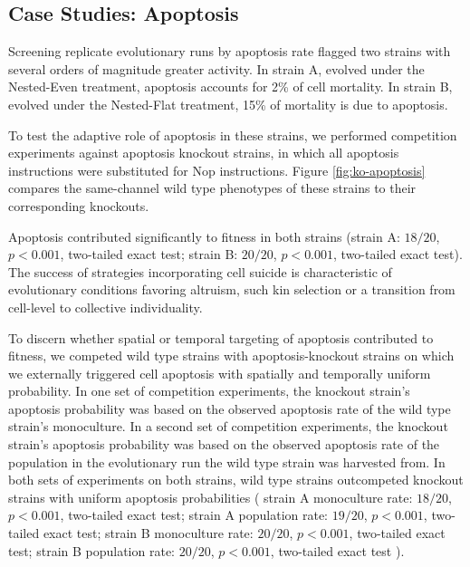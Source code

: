 \subsection{Case Studies: Apoptosis} \label{sec:apoptosis}



Screening replicate evolutionary runs by apoptosis rate flagged two strains with several orders of magnitude greater activity.
In strain A, evolved under the Nested-Even treatment, apoptosis accounts for 2\% of cell mortality.
In strain B, evolved under the Nested-Flat treatment, 15\% of mortality is due to apoptosis.

To test the adaptive role of apoptosis in these strains, we performed competition experiments against apoptosis knockout strains, in which all apoptosis instructions were substituted for Nop instructions.
Figure \ref{fig:ko-apoptosis} compares the same-channel wild type phenotypes of these strains to their corresponding knockouts.

Apoptosis contributed significantly to fitness in both strains (strain A: $18/20$, $p < 0.001$, two-tailed exact test; strain B: $20/20$, $p < 0.001$, two-tailed exact test).
The success of strategies incorporating cell suicide is characteristic of evolutionary conditions favoring altruism, such kin selection or a transition from cell-level to collective individuality.

To discern whether spatial or temporal targeting of apoptosis contributed to fitness, we competed wild type strains with apoptosis-knockout strains on which we externally triggered cell apoptosis with spatially and temporally uniform probability.
In one set of competition experiments, the knockout strain's apoptosis probability was based on the observed apoptosis rate of the wild type strain's monoculture.
In a second set of competition experiments, the knockout strain's apoptosis probability was based on the observed apoptosis rate of the population in the evolutionary run the wild type strain was harvested from.
In both sets of experiments on both strains, wild type strains outcompeted knockout strains with uniform apoptosis probabilities
(%
strain A \@ monoculture rate: $18/20$, $p < 0.001$, two-tailed exact test;
strain A \@ population rate: $19/20$, $p < 0.001$, two-tailed exact test;
strain B \@ monoculture rate: $20/20$, $p < 0.001$, two-tailed exact test;
strain B \@ population rate: $20/20$, $p < 0.001$, two-tailed exact test%
). %
